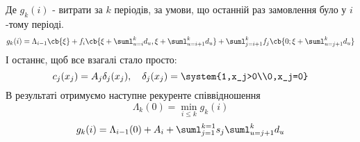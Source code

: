 Де $g_k(i)$ - витрати за $k$ періодів, за умови, що останній раз замовлення було у $i$-тому періоді.
\begin{equation}
	g_k(i) = \Lambda_{i-1}\cb{\xi} + f_i\cb{\xi + \suml_{u=i}^k d_u,\xi + \suml_{u=i+1}^k d_u} + \suml_{j=i+1}^k f_j \cb{0;\xi + \suml_{u=j+1}^k d_u}
\end{equation}
І останнє, щоб все взагалі стало просто:
\begin{equation}
	c_j(x_j) = A_j \delta_j(x_j), \quad\delta_j(x_j) = \system{1,x_j>0\\0,x_j=0}
\end{equation}
В результаті отримуємо наступне рекуренте співвідношення
\begin{equation}
	\Lambda_k(0) = \min\limits_{i\leq k} g_k(i)
\end{equation}
\begin{equation}
	g_k(i) = \Lambda_{i-1}(0) + A_i + \suml_{j=1}^{k=1} s_j\suml_{u=j+1}^k d_u
\end{equation}